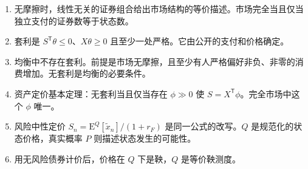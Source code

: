 \WJChapterSummary
\begin{tcolorbox}[summary]
\begin{enumerate}
    \item 无摩擦时，线性无关的证券组合给出市场结构的等价描述。市场完全当且仅当独立支付的证券数等于状态数。
    \item 套利是 $S^{\mathsf T}\theta\le 0$、$X\theta\ge 0$ 且至少一处严格。它由公开的支付和价格确定。
    \item 均衡中不存在套利。前提是市场无摩擦，且至少有人严格偏好非负、非零的消费增加。无套利是均衡的必要条件。
    \item 资产定价基本定理：无套利当且仅当存在 $\phi\gg 0$ 使 $S=X^{\mathsf T}\phi$。完全市场中这个 $\phi$ 唯一。
    \item 风险中性定价 $S_n=\mathrm{E}^{Q}[\tilde{x}_n]/(1+r_F)$ 是同一公式的改写。$Q$ 是规范化的状态价格，真实概率 $P$ 则描述状态发生的可能性。
    \item 用无风险债券计价后，价格在 $Q$ 下是鞅，$Q$ 是等价鞅测度。
\end{enumerate}
\end{tcolorbox}
\fi

\WJChapterExercises


\endgroup
